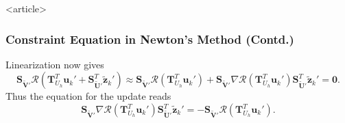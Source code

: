 \begin{frame}<article>
\frametitle<presentation>{Constraint Equation in Newton's Method (Contd.)}
Linearization now gives
\begin{equation*}
\mathbf{S}_{\tilde{\mathbf{V}}'}
\mathcal{R}\left(\mathbf{T}^T_{U_h}\mathbf{u}_{k}' + 
\mathbf{S}^T_{\tilde{\mathbf{U}}'} \tilde{\mathbf{z}}_{k}'\right)
\approx \mathbf{S}_{\tilde{\mathbf{V}}'}
\mathcal{R}\left(\mathbf{T}^T_{U_h}\mathbf{u}_{k}'\right) 
+ \mathbf{S}_{\tilde{\mathbf{V}}'} \nabla
\mathcal{R}\left(\mathbf{T}^T_{U_h}\mathbf{u}_{k}'\right)
\mathbf{S}^T_{\tilde{\mathbf{U}}'} \tilde{\mathbf{z}}_{k}' = \mathbf{0}.
\end{equation*}
Thus the equation for the update reads
\begin{equation*}
\mathbf{S}_{\tilde{\mathbf{V}}'} \nabla
\mathcal{R}\left(\mathbf{T}^T_{U_h}\mathbf{u}_{k}'\right)
\mathbf{S}^T_{\tilde{\mathbf{U}}'} \tilde{\mathbf{z}}_{k}'
= - \mathbf{S}_{\tilde{\mathbf{V}}'}
\mathcal{R}\left(\mathbf{T}^T_{U_h}\mathbf{u}_{k}'\right) .
\end{equation*}
\end{frame}

\cleardoublepage
